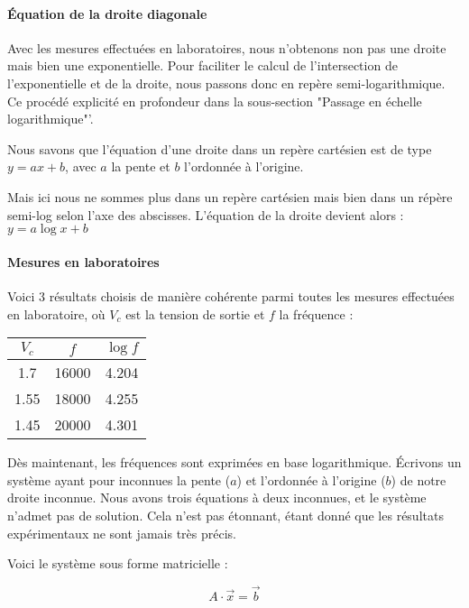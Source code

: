 \paragraph{Équation de la droite diagonale}

Avec les mesures effectuées en laboratoires, nous n'obtenons non pas une droite mais bien une exponentielle. Pour faciliter le calcul de l'intersection de l'exponentielle et de la droite, nous passons donc en repère semi-logarithmique. Ce procédé explicité en profondeur dans la sous-section "Passage en échelle logarithmique"'.

Nous savons que l'équation d'une droite dans un repère cartésien est de type $y=ax+b$, avec $a$ la pente et $b$ l'ordonnée à l'origine.

Mais ici nous ne sommes plus dans un repère cartésien mais bien dans un répère semi-log selon l'axe des abscisses. L'équation de la droite devient alors : $y=a\log{x}+b$

\paragraph{Mesures en laboratoires}

Voici 3 résultats choisis de manière cohérente parmi toutes les mesures effectuées en laboratoire, où $V_c$ est la tension de sortie et $f$ la fréquence :

\begin{center}
\begin{tabular}{|c|c|c|}
\hline
$V_c$ & $f$ & $\log{f}$ \\
\hline
1.7 & 16000 & 4.204 \\
\hline
1.55 & 18000 & 4.255 \\
\hline
1.45 & 20000 & 4.301 \\
\hline
\end{tabular}
\end{center}

Dès maintenant, les fréquences sont exprimées en base logarithmique.
Écrivons un système ayant pour inconnues la pente ($a$) et l'ordonnée à l'origine ($b$) de notre droite inconnue.
Nous avons trois équations à deux inconnues, et le système n'admet pas de solution.
Cela n'est pas étonnant, étant donné que les résultats expérimentaux ne sont jamais très précis.

Voici le système sous forme matricielle :

$$A \cdot \vec{x} = \vec{b}$$

